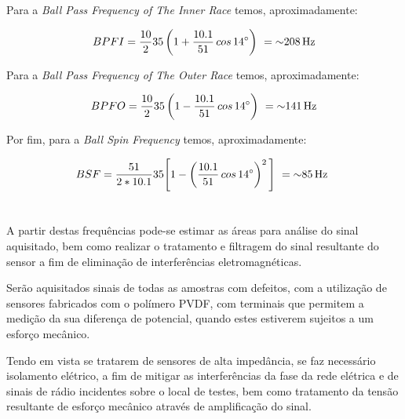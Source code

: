 \documentclass[
	12pt,				
	oneside,			
	a4paper,			
	english,			
	brazil,			
	]{abntex2ppgsi}
\begin{document}
Para a \textit{Ball Pass Frequency of The Inner Race} temos, aproximadamente:

\begin{equation}
	BPFI = \frac{10}{2}35 \left ( 1 + \frac{10.1}{51} \,cos \, \ang{14} \right )  \ = \SI{~208}{{\hertz}}
	\label{eq: BPFI no rolamento}
\end{equation}


Para a \textit{Ball Pass Frequency of The Outer Race} temos, aproximadamente:

\begin{equation}
	BPFO = \frac{10}{2}35 \left ( 1 - \frac{10.1}{51} \,cos \, \ang{14} \right )  \ = \SI{~141}{{\hertz}}
	\label{eq: BPFO no Rolamento}
\end{equation}


Por fim, para a \textit{Ball Spin Frequency} temos, aproximadamente:

\begin{equation}
	BSF = \frac{51}{2*10.1}35 \Bigg[  1 - \left ( \frac{10.1}{51} \,cos \, \ang{14} \right ) ^{2}  \Bigg] \ = \SI{~85}{{\hertz}} \
	\label{eq: BSF no rolamento}
\end{equation}


\section{}

A partir destas frequências pode-se estimar as áreas para análise do sinal aquisitado, bem como realizar o tratamento e filtragem do sinal resultante do sensor a fim de eliminação de interferências eletromagnéticas. 

Serão aquisitados sinais de todas as amostras com defeitos, com a utilização de sensores fabricados com o polímero PVDF, com terminais que permitem a medição da sua diferença de potencial, quando estes estiverem sujeitos a um esforço mecânico. 

Tendo em vista se tratarem de sensores de alta impedância, se faz necessário isolamento elétrico, a fim de mitigar as interferências da fase da rede elétrica e de sinais de rádio incidentes sobre o local de testes, bem como tratamento da tensão resultante de esforço mecânico através de amplificação do sinal. 
\end{document}
